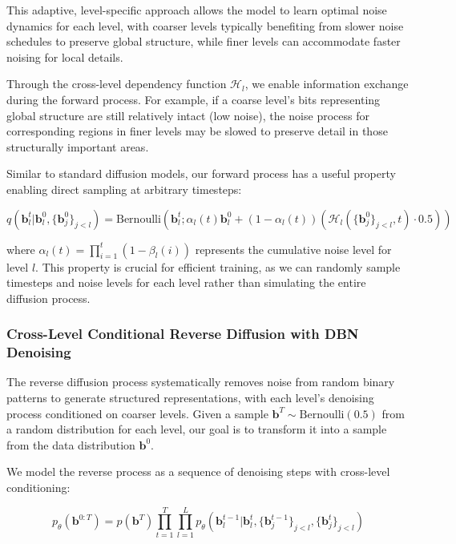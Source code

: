 \documentclass[10pt,twocolumn,letterpaper]{article}
\newcommand{\bm}[1]{\boldsymbol{#1}}
\newcommand{\binary}{\bm{b}}
\newcommand{\Bernoulli}{\text{Bernoulli}}
\begin{document}
This adaptive, level-specific approach allows the model to learn optimal noise dynamics for each level, with coarser levels typically benefiting from slower noise schedules to preserve global structure, while finer levels can accommodate faster noising for local details.

Through the cross-level dependency function $\mathcal{H}_l$, we enable information exchange during the forward process. For example, if a coarse level's bits representing global structure are still relatively intact (low noise), the noise process for corresponding regions in finer levels may be slowed to preserve detail in those structurally important areas.

Similar to standard diffusion models, our forward process has a useful property enabling direct sampling at arbitrary timesteps:

\begin{equation}
q(\binary_l^t|\binary_l^0, \{\binary_j^{0}\}_{j<l}) = \Bernoulli(\binary_l^t; \alpha_l(t)\binary_l^0 + (1-\alpha_l(t))(\mathcal{H}_l(\{\binary_j^{0}\}_{j<l}, t) \cdot 0.5))
\end{equation}

where $\alpha_l(t) = \prod_{i=1}^{t}(1-\beta_l(i))$ represents the cumulative noise level for level $l$. This property is crucial for efficient training, as we can randomly sample timesteps and noise levels for each level rather than simulating the entire diffusion process.

\subsubsection{Cross-Level Conditional Reverse Diffusion with DBN Denoising}
The reverse diffusion process systematically removes noise from random binary patterns to generate structured representations, with each level's denoising process conditioned on coarser levels. Given a sample $\binary^T \sim \Bernoulli(0.5)$ from a random distribution for each level, our goal is to transform it into a sample from the data distribution $\binary^0$.

We model the reverse process as a sequence of denoising steps with cross-level conditioning:

\begin{equation}
p_\theta(\binary^{0:T}) = p(\binary^T) \prod_{t=1}^{T} \prod_{l=1}^{L} p_\theta(\binary_l^{t-1}|\binary_l^t, \{\binary_j^{t-1}\}_{j<l}, \{\binary_j^{t}\}_{j<l})
\end{equation}
\end{document}
